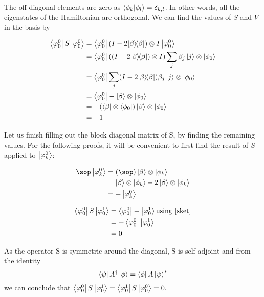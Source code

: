 The off-diagonal elements are zero as $ \braket{\phi_k}{\phi_l} = \delta_{k,l}$. In other words, all the eigenstates of the Hamiltonian are orthogonal. We can find the values of $S$ and  $V$ in the basis by

\begin{align} \begin{split}
\left\langle{\varphi_0^0}\right\vert S\left\vert{\varphi_0^0}\right\rangle &= \left\langle{\varphi_0^0}\right\vert (I-2| \beta \rangle\!\langle \beta |) \otimes I \left\vert{\varphi_0^0}\right\rangle\\
&= \left\langle{\varphi^0_0}\right\vert ((I-2| \beta \rangle\!\langle \beta |) \otimes I) \sum_j\beta_j\left\vert{j }\right\rangle\otimes \left\vert{\phi_0}\right\rangle \\
&= \left\langle{\varphi^0_0}\right\vert \sum_j (I-2| \beta \rangle\!\langle \beta |) \beta_j\left\vert{j}\right\rangle \otimes \left\vert{\phi_0}\right\rangle\\
&= \left\langle{\varphi^0_0}\right\vert - \left\vert{\beta}\right\rangle \otimes \left\vert{\phi_0}\right\rangle\\
&= - (\left\langle{\beta}\right\vert \otimes \left\langle{\phi_0}\right\vert)  \left\vert{\beta}\right\rangle \otimes \left\vert{\phi_0}\right\rangle\\
&= -1
\end{split} \end{align}

Let us finish filling out the block diagonal matrix of S, by finding the remaining values. For the following proofs, it will be convenient to first find the result of $S$ applied to $\left\vert{\varphi_k^0}\right\rangle$:

\begin{align} \begin{split} \label{Sket}
  \sop \ket{\varphi_k^0} &= (\sop) \ket{\beta} \otimes \ket{\phi_k}\\
  &= \ket{\beta} \otimes \ket{\phi_k} - 2 \ket{\beta} \otimes \ket{\phi_k}\\
  &= - \ket{\varphi_k^0}
\end{split} \end{align}

\begin{align} \begin{split}
\left\langle{\varphi_0^0}\right\vert S\left\vert{\varphi_0^1}\right\rangle &= \left\langle{\varphi_0^0}\right\vert - \left\vert{\varphi_0^1}\right\rangle \text{using \ref{sket}}\\
&= - \left\langle{\varphi_0^0}\right\vert \left\vert{\varphi_0^1}\right\rangle\\
&= 0
\end{split} \end{align}

As the operator S is symmetric around the diagonal, S is self adjoint and from the identity $$\left\langle{\psi}\right\vert A^{\dagger}\left\vert{\phi}\right\rangle= \left\langle{\phi}\right\vert A \left\vert{\psi}\right\rangle^{*}$$
we can conclude that $\left\langle{\varphi_0^0}\right\vert S\left\vert{\varphi_0^1}\right\rangle = \left\langle{\varphi_0^1}\right\vert S\left\vert{\varphi_0^0}\right\rangle = 0.$

